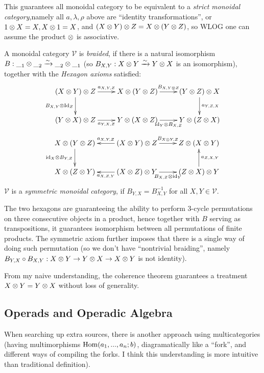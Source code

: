 \documentclass{article}
\begin{document}
This guarantees all monoidal category to be equivalent to a \emph{strict monoidal category},namely all $a,\lambda,\rho$ above are ``identity transformations'', or $1\otimes X=X,X\otimes 1=X$, and $(X\otimes Y)\otimes Z=X\otimes (Y\otimes Z)$, so WLOG one can assume the product $\otimes$ is associative.

\begin{defn}
    A monoidal category $\mathcal{V}$ is \emph{braided}, if there is a natural isomorphism $B:\__{1} \otimes \__{2}\xrightarrow{\sim} \__{2}\otimes \__{1}$ (so $B_{X,Y}:X\otimes Y\xrightarrow{\sim}Y\otimes X$ is an isomorphism), together with the \emph{Hexagon axioms} satisfied:
    \[\xymatrix{
        (X\tensor Y)\tensor Z \ar[r]^-{a_{X,Y,Z}} \ar[d]_-{B_{X,Y}\tensor \Id_Z} & X\tensor (Y\tensor Z)\ar[r]^-{B_{X,Y\tensor Z}} & (Y\tensor Z)\tensor X \ar[d]^-{a_{Y,Z,X}}\\
        (Y\tensor X)\tensor Z \ar[r]_-{a_{Y,X,Z}} & Y\tensor (X\tensor Z) \ar[r]_-{\id_Y\tensor B_{X,Z}} & Y\tensor (Z\tensor X)
    }\]
    \[\xymatrix{
        X\tensor (Y\tensor Z) \ar[d]_-{\id_X\tensor B_{Y,Z}} & (X\tensor Y)\tensor Z \ar[l]_-{a_{X,Y,Z}} \ar[r]^-{B_{X\tensor Y,Z}} & Z\tensor (X\tensor Y)\\
        X\tensor (Z\tensor Y) & (X\tensor Z)\tensor Y \ar[l]^-{a_{X,Z,Y}} \ar[r]_-{B_{X,Z}\tensor \id_Y} & (Z\tensor X)\tensor Y \ar[u]_-{a_{Z,X,Y}}
    }\]
    $\mathcal{V}$ is a \emph{symmetric monoidal category}, if $B_{Y,X}=B_{X,Y}^{-1}$ for all $X,Y\in\mathcal{V}$.
\end{defn}
The two hexagons are guaranteeing the ability to perform 3-cycle permutations on three consecutive objects in a product, hence together with $B$ serving as transpositions, it guarantees isomorphism between all permutations of finite products. The symmetric axiom further imposes that there is a single way of doing such permutation (so we don't have ``nontrivial braiding'', namely $B_{Y,X}\circ B_{X,Y}:X\otimes Y\rightarrow Y\otimes X\rightarrow X\otimes Y$ is not identity).

From my naive understanding, the coherence theorem guarantees a treatment $X\otimes Y=Y\otimes X$ without loss of generality.

\newpage

\subsection{Operads and Operadic Algebra}
When searching up extra sources, there is another approach using multicategories (having multimorphisms $\mathrm{Hom}(a_1,...,a_n; b)$, diagramatically like a ``fork'', and different ways of compiling the forks. I think this understanding is more intuitive than traditional definition). 
\end{document}

